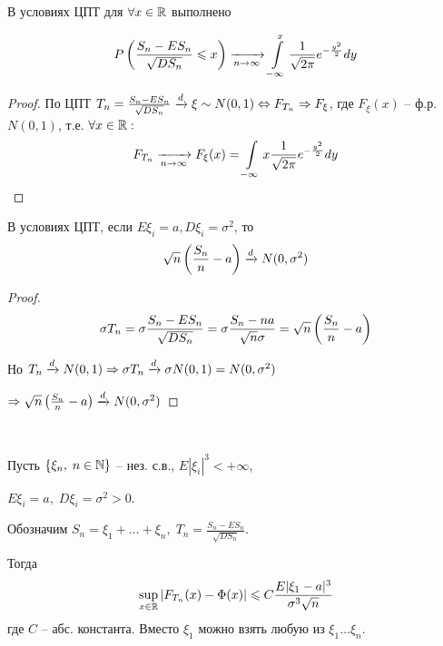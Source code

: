 \begin{corollary}
  В условиях ЦПТ для $\forall x \in \mathbb{R}$ выполнено
  
  \begin{align*}
    P\left( \frac{S_n - E S_n}{\sqrt{D S_n}} \leqslant x \right) 
    \xrightarrow[n \to \infty]{} \int\limits_{-\infty}^{x} \frac{1}{\sqrt{2\pi}} e^{-\frac{y^2}{2}} dy
  \end{align*}

  \begin{proof}
    По ЦПТ $T_n = \frac{S_n - E S_n}{\sqrt{D S_n}} \xrightarrow{d} \xi \sim N(0, 1) 
    \Leftrightarrow F_{T_n} \Rightarrow F_{\xi}$, где $F_{\xi} (x)$  -- ф.р. $N(0, 1)$, т.е.
    $\forall x \in \mathbb{R}:$
    \begin{align*}
      F_{T_n} \xrightarrow[n \to \infty]{} F_{\xi} (x) 
      = \int\limits_{-\infty}{x} \frac{1}{\sqrt{2 \pi}} e^{-\frac{y^2}{2}} dy
    \end{align*}
  \end{proof}
\end{corollary}

\begin{corollary}
  В условиях ЦПТ, если $E \xi_i = a, D \xi_i = \sigma^2$, то
  \begin{align*}
    \sqrt{n} \left( \frac{S_n}{n} - a \right) \xrightarrow{d} N(0, \sigma^2)
  \end{align*}

  \begin{proof}
    \begin{align*}
      \sigma T_n = \sigma \frac{S_n - E S_n}{\sqrt{D S_n}} 
      = \sigma \frac{S_n - na}{\sqrt{n} \sigma} = \sqrt{n} \left( \frac{S_n}{n} - a \right)
    \end{align*}

    Но $T_n \xrightarrow{d} N(0, 1) \Rightarrow \sigma T_n \xrightarrow{d} \sigma N(0, 1) = N(0, \sigma^2)$

    $\Rightarrow \sqrt{n} \left( \frac{S_n}{n} - a \right) \xrightarrow{d} N(0, \sigma^2)$
  \end{proof}
\end{corollary}

\begin{theorem}~

  Пусть $\{ \xi_n,\; n \in \mathbb{N} \}$ -- нез. с.в., $E |\xi_i|^3 < +\infty$,
  
  $E \xi_i = a,\; D \xi_i = \sigma^2 > 0$. 

  Обозначим $S_n = \xi_1 + \ldots + \xi_n, \; T_n = \frac{S_n - E S_n}{\sqrt{D S_n}}$.

  Тогда
  \begin{align*}
    \sup\limits_{x \in \mathbb{R}} |F_{T_n} (x) - \Phi(x)| 
    \leqslant C \frac{E |\xi_1 - a|^3}{\sigma^3 \sqrt{n}}
  \end{align*}
  где $C$ -- абс. константа. Вместо $\xi_1$ можно взять любую из $\xi_1 \ldots \xi_n$.
\end{theorem}


